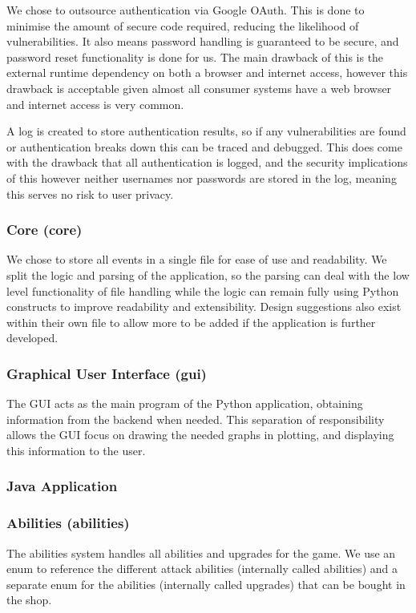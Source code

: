 We chose to outsource authentication via Google OAuth. This is done to minimise the amount of secure code required, reducing the likelihood of vulnerabilities. It also means password handling is guaranteed to be secure, and password reset functionality is done for us. The main drawback of this is the external runtime dependency on both a browser and internet access, however this drawback is acceptable given almost all consumer systems have a web browser and internet access is very common.

A log is created to store authentication results, so if any vulnerabilities are found or authentication breaks down this can be traced and debugged. This does come with the drawback that all authentication is logged, and the security implications of this however neither usernames nor passwords are stored in the log, meaning this serves no risk to user privacy.

\subsubsection{Core (core)}
We chose to store all events in a single file for ease of use and readability. We split the logic and parsing of the application, so the parsing can deal with the low level functionality of file handling while the logic can remain fully using Python constructs to improve readability and extensibility. Design suggestions also exist within their own file to allow more to be added if the application is further developed.

\subsubsection{Graphical User Interface (gui)}
The GUI acts as the main program of the Python application, obtaining information from the backend when needed. This separation of responsibility allows the GUI focus on drawing the needed graphs in plotting, and displaying this information to the user.

\subsubsection{Java Application}

\subsubsection{Abilities (abilities)}
The abilities system handles all abilities and upgrades for the game. We use an enum to reference the different attack abilities (internally called abilities) and a separate enum for the abilities (internally called upgrades) that can be bought in the shop.

